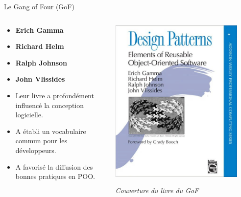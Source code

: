 \documentclass[aspectratio=169]{beamer}
\begin{document}
\begin{frame}{Le Gang of Four (GoF)}
    \begin{columns}
        \begin{column}{0.6\textwidth}
            \begin{itemize}
                \item \textbf{Erich Gamma}
                \item \textbf{Richard Helm}
                \item \textbf{Ralph Johnson}
                \item \textbf{John Vlissides}
            \end{itemize}
            \pause
            \begin{itemize}
                \item Leur livre a profondément influencé la conception logicielle.
                \item A établi un vocabulaire commun pour les développeurs.
                \item A favorisé la diffusion des bonnes pratiques en POO.
            \end{itemize}
        \end{column}
        \begin{column}{0.4\textwidth}
            \includegraphics[width=0.9\textwidth]{pic/gof_book.jpg}
            \begin{center}
                \small{\textit{Couverture du livre du GoF}}
            \end{center}
        \end{column}
    \end{columns}
\end{frame}
\end{document}
